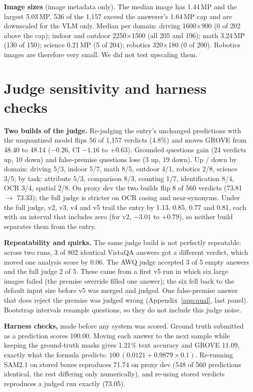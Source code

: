 \documentclass{article}
\begin{document}
\textbf{Image sizes} (image metadata only). The median image has 1.44\,MP and the largest 5.03\,MP. 536 of the 1,157 exceed the answerer's
1.64\,MP cap and are downscaled for the VLM only. Median per domain: driving 1600$\times$900 (0 of 202 above the cap); indoor and
outdoor 2250$\times$1500 (all 205 and 196); math 3.24\,MP (130 of 150); science 0.21\,MP (5 of 204); robotics 320$\times$180 (0 of 200).
Robotics images are therefore very small. We did not test upscaling them.

\section{Judge sensitivity and harness checks}\label{app:judge}
\textbf{Two builds of the judge.} Re-judging the entry's unchanged predictions with the unquantized model flips 56 of 1,157 verdicts
(4.8\%) and moves GROVE from 48.40 to 48.14 ($-0.26$, CI $-1.16$ to $+0.63$). Grounded questions gain (24 verdicts up, 10 down) and
false-premise questions lose (3 up, 19 down). Up / down by domain: driving 5/3, indoor 5/7, math 8/5, outdoor 4/1, robotics 2/8, science
3/5; by task: attribute 5/3, comparison 8/3, counting 1/7, identification 8/4, OCR 3/4, spatial 2/8. On proxy dev the two builds flip 8
of 560 verdicts (73.81 $\to$ 73.33); the full judge is stricter on OCR casing and near-synonyms. Under the full judge, v2, v3, v4 and
v5 trail the entry by 1.13, 0.85, 0.77 and 0.81, each with an interval that includes zero (for v2, $-3.01$ to $+0.79$), so neither
build separates them from the entry.

\textbf{Repeatability and quirks.} The same judge build is not perfectly repeatable: across two runs, 3 of 802 identical VistaQA
answers got a different verdict, which moved one analysis score by 0.06. The AWQ judge accepted 3 of 5 empty answers and the full
judge 2 of 5. These came from a first v5 run in which six large images failed (the premise override filled one answer); the six
fell back to the default input size before v5 was merged and judged. One false-premise answer that does reject the premise was judged wrong (Appendix~\ref{app:qual}, last panel).
Bootstrap intervals resample questions, so they do not include this judge noise.

\textbf{Harness checks,} made before any system was scored. Ground truth submitted as a prediction scores 100.00. Moving each answer
to the next sample while keeping the ground-truth masks gives 1.21\% text accuracy and GROVE 11.09, exactly what the formula
predicts: $100\,(0.0121 + 0.9879 \times 0.1)$. Re-running SAM2.1 on stored boxes reproduces 71.74 on proxy dev (548 of 560
predictions identical, the rest differing only numerically), and re-using stored verdicts reproduces a judged run exactly (73.05).
\end{document}
